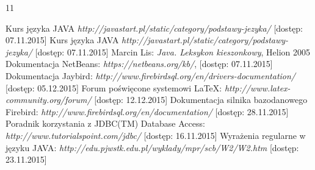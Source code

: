 

\raggedright

\setcounter{secnumdepth}{-1}
\begin {thebibliography}{11} 

 Kurs języka JAVA  \emph{http://javastart.pl/static/category/podstawy-jezyka/} [dostęp: 07.11.2015]
\vspace{1.21em}
 Kurs języka JAVA  \emph{http://javastart.pl/static/category/podstawy-jezyka/} [dostęp: 07.11.2015]
\vspace{1.21em}
 Marcin Lis: \emph{Java. Leksykon kieszonkowy}, Helion 2005
\vspace{1.21em}
 Dokumentacja NetBeans: \emph{https://netbeans.org/kb/}, [dostęp: 07.11.2015]
\vspace{1.21em}
 Dokumentacja Jaybird: \emph{http://www.firebirdsql.org/en/drivers-documentation/} [dostęp: 05.12.2015]
\vspace{1.21em}
 Forum poświęcone systemowi LaTeX: \emph{http://www.latex-community.org/forum/} [dostęp: 12.12.2015]
\vspace{1.21em}
 Dokumentacja silnika bazodanowego Firebird: \emph{http://www.firebirdsql.org/en/documentation/} [dostęp: 28.11.2015]
\vspace{1.21em}
 Poradnik korzystania z JDBC(TM) Database Access: \emph{http://www.tutorialspoint.com/jdbc/} [dostęp: 16.11.2015]
\vspace{1.21em}
 Wyrażenia regularne w języku JAVA: \emph{http://edu.pjwstk.edu.pl/wyklady/mpr/scb/W2/W2.htm} [dostęp: 23.11.2015]
\end {thebibliography}

